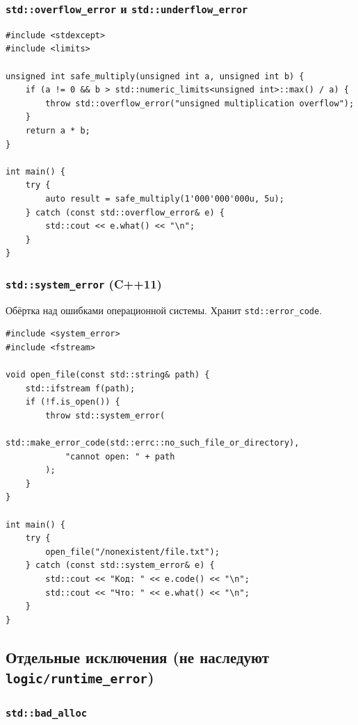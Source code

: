 \documentclass[a4paper,12pt]{article}
\begin{document}
\subsubsection{\texttt{std::overflow\_error} и \texttt{std::underflow\_error}}

\begin{lstlisting}
#include <stdexcept>
#include <limits>

unsigned int safe_multiply(unsigned int a, unsigned int b) {
    if (a != 0 && b > std::numeric_limits<unsigned int>::max() / a) {
        throw std::overflow_error("unsigned multiplication overflow");
    }
    return a * b;
}

int main() {
    try {
        auto result = safe_multiply(1'000'000'000u, 5u);
    } catch (const std::overflow_error& e) {
        std::cout << e.what() << "\n";
    }
}
\end{lstlisting}

\subsubsection{\texttt{std::system\_error} (C++11)}

Обёртка над ошибками операционной системы. Хранит \texttt{std::error\_code}.

\begin{lstlisting}
#include <system_error>
#include <fstream>

void open_file(const std::string& path) {
    std::ifstream f(path);
    if (!f.is_open()) {
        throw std::system_error(
            std::make_error_code(std::errc::no_such_file_or_directory),
            "cannot open: " + path
        );
    }
}

int main() {
    try {
        open_file("/nonexistent/file.txt");
    } catch (const std::system_error& e) {
        std::cout << "Код: " << e.code() << "\n";
        std::cout << "Что: " << e.what() << "\n";
    }
}
\end{lstlisting}

\subsection{Отдельные исключения (не наследуют \texttt{logic/runtime\_error})}

\subsubsection{\texttt{std::bad\_alloc}}
\end{document}
